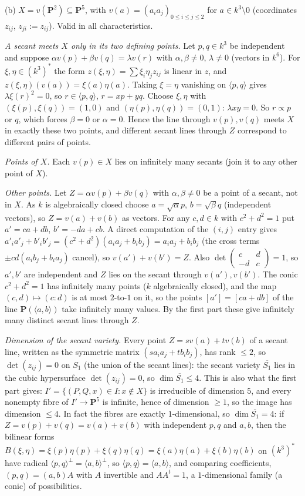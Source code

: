 \documentclass[11pt]{article}
\begin{document}
(b) $X=v(\mathbf P^2)\subseteq\mathbf P^5$, with $v(a)=(a_ia_j)_{0\le i\le j\le2}$ for $a\in k^3\setminus0$ (coordinates $z_{ij}$, $z_{ji}:=z_{ij}$). Valid in all characteristics.

\emph{A secant meets $X$ only in its two defining points.} Let $p,q\in k^3$ be independent and suppose $\alpha v(p)+\beta v(q)=\lambda v(r)$ with $\alpha,\beta\ne0$, $\lambda\ne0$ (vectors in $k^6$). For $\xi,\eta\in(k^3)^*$ the form $z(\xi,\eta)=\sum\xi_i\eta_jz_{ij}$ is linear in $z$, and $z(\xi,\eta)(v(a))=\xi(a)\eta(a)$. Taking $\xi=\eta$ vanishing on $\langle p,q\rangle$ gives $\lambda\xi(r)^2=0$, so $r\in\langle p,q\rangle$, $r=xp+yq$. Choose $\xi,\eta$ with $(\xi(p),\xi(q))=(1,0)$ and $(\eta(p),\eta(q))=(0,1)$: $\lambda xy=0$. So $r\propto p$ or $q$, which forces $\beta=0$ or $\alpha=0$. Hence the line through $v(p),v(q)$ meets $X$ in exactly these two points, and different secant lines through $Z$ correspond to different pairs of points.

\emph{Points of $X$.} Each $v(p)\in X$ lies on infinitely many secants (join it to any other point of $X$).

\emph{Other points.} Let $Z=\alpha v(p)+\beta v(q)$ with $\alpha,\beta\ne0$ be a point of a secant, not in $X$. As $k$ is algebraically closed choose $a=\sqrt\alpha p$, $b=\sqrt\beta q$ (independent vectors), so $Z=v(a)+v(b)$ as vectors. For any $c,d\in k$ with $c^2+d^2=1$ put $a'=ca+db$, $b'=-da+cb$. A direct computation of the $(i,j)$ entry gives $a'_ia'_j+b'_ib'_j=(c^2+d^2)(a_ia_j+b_ib_j)=a_ia_j+b_ib_j$ (the cross terms $\pm cd(a_ib_j+b_ia_j)$ cancel), so $v(a')+v(b')=Z$. Also $\det\begin{pmatrix}c&d\\-d&c\end{pmatrix}=1$, so $a',b'$ are independent and $Z$ lies on the secant through $v(a'),v(b')$. The conic $c^2+d^2=1$ has infinitely many points ($k$ algebraically closed), and the map $(c,d)\mapsto(c:d)$ is at most $2$-to-$1$ on it, so the points $[a']=[ca+db]$ of the line $\mathbf P(\langle a,b\rangle)$ take infinitely many values. By the first part these give infinitely many distinct secant lines through $Z$.

\emph{Dimension of the secant variety.} Every point $Z=sv(a)+tv(b)$ of a secant line, written as the symmetric matrix $(sa_ia_j+tb_ib_j)$, has rank $\le2$, so $\det(z_{ij})=0$ on $S_1$ (the union of the secant lines): the secant variety $\overline{S_1}$ lies in the cubic hypersurface $\det(z_{ij})=0$, so $\dim\overline{S_1}\le4$. This is also what the first part gives: $I'=\{(P,Q,x)\in I:x\notin X\}$ is irreducible of dimension $5$, and every nonempty fibre of $I'\to\mathbf P^5$ is infinite, hence of dimension $\ge1$, so the image has dimension $\le4$. In fact the fibres are exactly $1$-dimensional, so $\dim\overline{S_1}=4$: if $Z=v(p)+v(q)=v(a)+v(b)$ with independent $p,q$ and $a,b$, then the bilinear forms $B(\xi,\eta)=\xi(p)\eta(p)+\xi(q)\eta(q)=\xi(a)\eta(a)+\xi(b)\eta(b)$ on $(k^3)^*$ have radical $\langle p,q\rangle^\perp=\langle a,b\rangle^\perp$, so $\langle p,q\rangle=\langle a,b\rangle$, and comparing coefficients, $(p,q)=(a,b)A$ with $A$ invertible and $AA^{t}=1$, a $1$-dimensional family (a conic) of possibilities.
\end{document}
